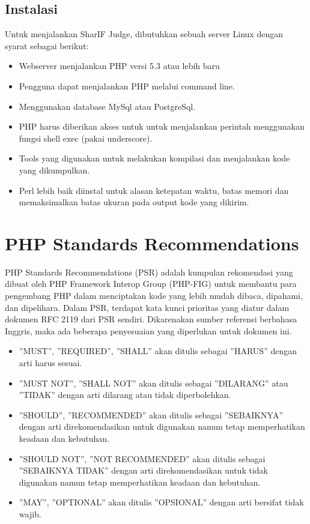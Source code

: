 \subsection{Instalasi}
Untuk menjalankan SharIF Judge, dibutuhkan sebuah server Linux dengan syarat sebagai berikut:
\begin{itemize}
	\item Webserver menjalankan PHP versi 5.3 atau lebih baru
	\item Pengguna dapat menjalankan PHP melalui command line.
	\item Menggunakan database MySql atau PostgreSql.
	\item PHP harus diberikan akses untuk untuk menjalankan perintah menggunakan fungsi shell exec (pakai underscore).
	\item Tools yang digunakan untuk melakukan kompilasi dan menjalankan kode yang dikumpulkan.
	\item Perl lebih baik diinstal untuk alasan ketepatan waktu, batas memori dan memaksimalkan batas ukuran pada output kode yang dikirim.
\end{itemize}




\section{PHP Standards Recommendations}
\label{sec:psr}

PHP Standards Recommendations (PSR) adalah kumpulan rekomendasi yang dibuat oleh PHP Framework Interop Group (PHP-FIG) untuk membantu para pengembang PHP dalam menciptakan kode yang lebih mudah dibaca, dipahami, dan dipelihara. 
Dalam PSR, terdapat kata kunci prioritas yang diatur dalam dokumen RFC 2119 dari PSR sendiri. Dikarenakan sumber referensi berbahasa Inggris, maka ada beberapa penyesuaian yang diperlukan untuk dokumen ini.

\begin{itemize}
	\item ''MUST'', ''REQUIRED'', ''SHALL'' akan ditulis sebagai ''HARUS'' dengan arti harus sesuai.
	\item ''MUST NOT'', ''SHALL NOT'' akan ditulis sebagai ''DILARANG'' atau ''TIDAK'' dengan arti dilarang atau tidak diperbolehkan.
	\item ''SHOULD'', ''RECOMMENDED'' akan ditulis sebagai ''SEBAIKNYA'' dengan arti direkomendasikan untuk digunakan namun tetap memperhatikan keadaan dan kebutuhan.
	\item ''SHOULD NOT'', ''NOT RECOMMENDED'' akan ditulis sebagai ''SEBAIKNYA TIDAK'' dengan arti direkomendasikan untuk tidak digunakan namun tetap memperhatikan keadaan dan kebutuhan.
	\item ''MAY'', ''OPTIONAL'' akan ditulis ''OPSIONAL'' dengan arti bersifat tidak wajib.
\end{itemize}



